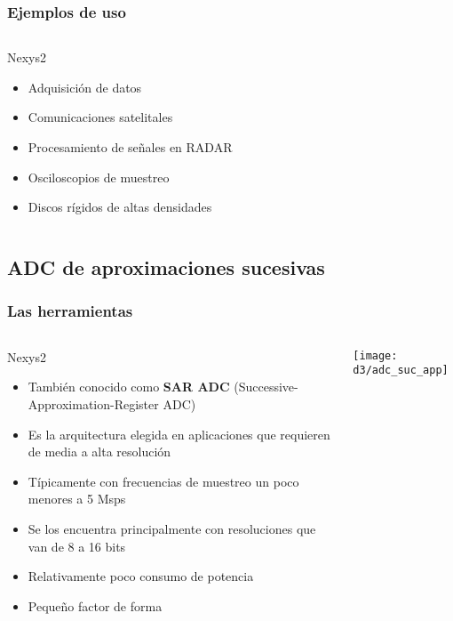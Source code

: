 \documentclass{beamer}
\begin{document}
\begin{frame}
\frametitle{Ejemplos de uso}
  \begin{columns}
    \begin{column}{0.45\textwidth}
      \begin{block}{Nexys2}
        \begin{itemize}
          \item  Adquisición de datos
          \item  Comunicaciones satelitales
          \item  Procesamiento de señales en RADAR
          \item  Osciloscopios de muestreo
          \item  Discos rígidos de altas densidades
        \end{itemize}
      \end{block}
    \end{column} 
  \end{columns}
\end{frame}

\subsection{ADC de aproximaciones sucesivas}

\begin{frame}
\frametitle{Las herramientas}
  \begin{columns}
    \begin{column}{0.45\textwidth}
      \begin{block}{Nexys2}
        \begin{itemize}
          \item  También conocido como \textbf{SAR ADC}
(Successive-Approximation-Register ADC)
          \item  Es la arquitectura elegida en aplicaciones que requieren de media a alta
resolución
          \item  Típicamente con frecuencias de muestreo un poco menores a 5 Msps
          \item  Se los encuentra principalmente con resoluciones que van de 8 a
16 bits
          \item  Relativamente poco consumo de potencia
          \item  Pequeño factor de forma %
        \end{itemize}
      \end{block}
    \end{column} 
    \begin{column}{0.65\textwidth}
      \texttt{[image: d3/adc\_suc\_app]}
    \end{column}
  \end{columns}
\end{frame}
\end{document}
